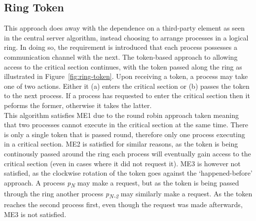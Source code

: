 \documentclass[conference]{IEEEtran}
\begin{document}
\subsection{Ring Token}
This approach does away with the dependence on a third-party element as seen in
the central server algorithm, instead choosing to arrange processes in
a logical ring. In doing so, the requirement is introduced that each process
possesses a communication channel with the next. The token-based approach to
allowing access to the critical section continues, with the token passed along
the ring as illustrated in Figure~\ref{fig:ring-token}. Upon receiving a token,
a process may take one of two actions. Either it (a) enters the critical
section or (b) passes the token to the next process. If a process has requested
to enter the critical section then it peforms the former, otherwise it takes
the latter.\\
This algorithm satisfies ME1 due to the round robin approach taken meaning that
two processes cannot execute in the critical section at the same time. There is
only a single token that is passed round, therefore only one process executing
in a critical section. ME2 is satisfied for similar reasons, as the token is
being continously passed around the ring each process will eventually gain
access to the critical section (even in cases where it did not request it). ME3
is however not satisfied, as the clockwise rotation of the token goes against
the `happened-before' approach. A process \textit{p\textsubscript{N}} may make
a request, but as the token is being passed through the ring another process
\textit{p\textsubscript{N-2}} may similarly make a request. As the token
reaches the second process first, even though the request was made afterwards,
ME3 is not satisfied.
\end{document}

